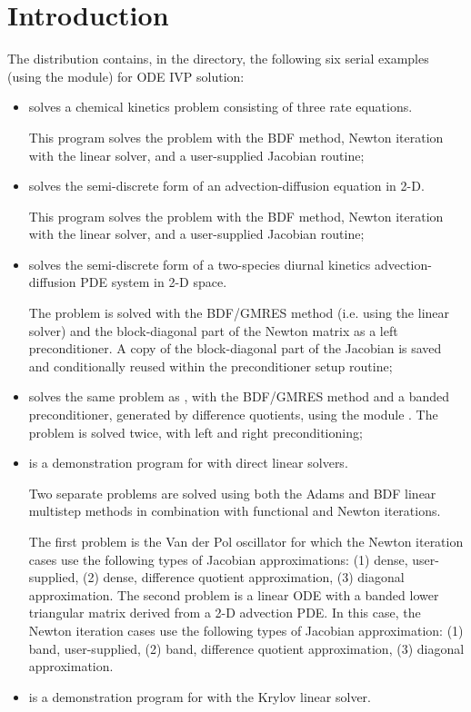 \section{Introduction}\label{s:ex_intro}

The {\cvode} distribution contains, in the 
directory, the following six serial examples (using the {\nvecs} module)
for ODE IVP solution:
\begin{itemize}
\item {}
  solves a chemical kinetics problem consisting of three rate equations.
  
  This program solves the problem with the BDF method, Newton          
  iteration with the {\cvdense} linear solver, and a user-supplied    
  Jacobian routine;
\item {}
  solves the semi-discrete form of an advection-diffusion equation in 2-D. 
  
  This program solves the problem with the BDF method, Newton          
  iteration with the {\cvband} linear solver, and a user-supplied     
  Jacobian routine;
\item {}
  solves the semi-discrete form of a two-species diurnal kinetics
  advection-diffusion PDE system in 2-D space. 

  The problem is solved with the BDF/GMRES method (i.e.    
  using the {\cvspgmr} linear solver) and the block-diagonal part of the  
  Newton matrix as a left preconditioner. A copy of the block-diagonal 
  part of the Jacobian is saved and conditionally reused within the    
  preconditioner setup routine;
\item {}
  solves the same problem as , with the BDF/GMRES method 
  and a banded preconditioner, generated by difference quotients, 
  using the module {\cvbandpre}.
  The problem is solved twice, with left and right preconditioning;
\item {}
  is a demonstration program for {\cvode} with direct linear solvers.

  Two separate problems are solved using both the Adams and BDF linear
  multistep methods in combination with functional and Newton
  iterations. 

  The first problem is the Van der Pol oscillator for which 
  the Newton iteration cases use the following types of Jacobian approximations:
  (1) dense, user-supplied, (2) dense, difference quotient approximation, 
  (3) diagonal approximation. The second problem is a linear ODE with a
  banded lower triangular matrix derived from a 2-D advection PDE. In this
  case, the Newton iteration cases use the following types of Jacobian
  approximation: (1) band, user-supplied, (2) band, difference       
  quotient approximation, (3) diagonal approximation.
\item {}
  is a demonstration program for {\cvode} with the Krylov linear solver.


\end{itemize}
